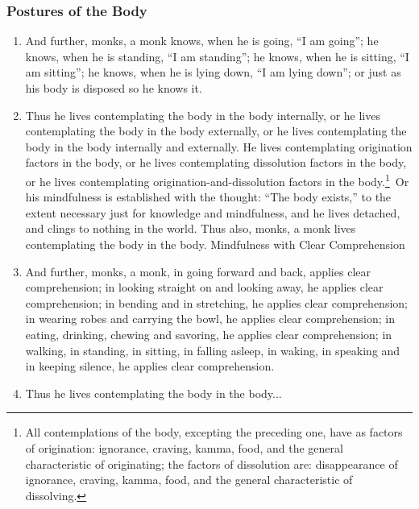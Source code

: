 \documentclass[a4 paper, 12pt]{article}
\begin{document}
\begin{multicols}{2}
\subsubsection*{Postures of the Body}
\begin{enumerate}[resume]
\item And further, monks, a monk knows, when he is going, “I am going”; he knows, when he is standing, “I am standing”; he knows, when he is sitting, “I am sitting”; he knows, when he is lying down, “I am lying down”; or just as his body is disposed so he knows it.
\item Thus he lives contemplating the body in the body internally, or he lives contemplating the body in the body externally, or he lives contemplating the body in the body internally and externally. He lives contemplating origination factors in the body, or he lives contemplating dissolution factors in the body, or he lives contemplating origination-and-dissolution factors in the body.\footnote{All contemplations of the body, excepting the preceding one, have as factors of origination: ignorance, craving, kamma, food, and the general characteristic of originating; the factors of dissolution are: disappearance of ignorance, craving, kamma, food, and the general characteristic of dissolving.} Or his mindfulness is established with the thought: “The body exists,” to the extent necessary just for knowledge and mindfulness, and he lives detached, and clings to nothing in the world. Thus also, monks, a monk lives contemplating the body in the body.
Mindfulness with Clear Comprehension
\item And further, monks, a monk, in going forward and back, applies clear comprehension; in looking straight on and looking away, he applies clear comprehension; in bending and in stretching, he applies clear comprehension; in wearing robes and carrying the bowl, he applies clear comprehension; in eating, drinking, chewing and savoring, he applies clear comprehension; in walking, in standing, in sitting, in falling asleep, in waking, in speaking and in keeping silence, he applies clear comprehension.
\item Thus he lives contemplating the body in the body...
\end{enumerate}


\end{multicols}
\end{document}
